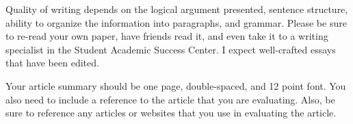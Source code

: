 \documentclass[11pt,]{article}
\begin{document}
Quality of writing depends on the logical argument presented, sentence
structure, ability to organize the information into paragraphs, and
grammar. Please be sure to re-read your own paper, have friends read it,
and even take it to a writing specialist in the Student Academic Success
Center. I expect well-crafted essays that have been edited.

Your article summary should be one page, double-spaced, and 12 point
font. You also need to include a reference to the article that you are
evaluating. Also, be sure to reference any articles or websites that you
use in evaluating the article.
\end{document}
